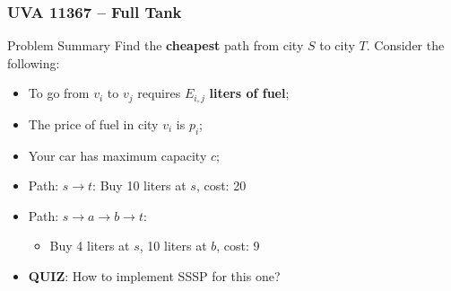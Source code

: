 \begin{frame}
  \frametitle{UVA 11367 -- Full Tank}
  \begin{block}{Problem Summary}
    Find the {\bf cheapest} path from city $S$ to city $T$. Consider the following:

    \begin{itemize}
      \item To go from $v_i$ to $v_j$ requires $E_{i,j}$ {\bf liters of fuel};
      \item The price of fuel in city $v_i$ is $p_i$;
      \item Your car has maximum capacity $c$;
    \end{itemize}
  \end{block}

  \begin{center}
  \end{center}

  \begin{itemize}
    \item Path: $s\to t$: Buy 10 liters at $s$, cost: 20
    \item Path: $s\to a\to b\to t$:
    \begin{itemize}
      \item Buy 4 liters at $s$, 10 liters at $b$, cost: 9
    \end{itemize}
    \item {\bf QUIZ}: How to implement SSSP for this one?
  \end{itemize}
\end{frame}

